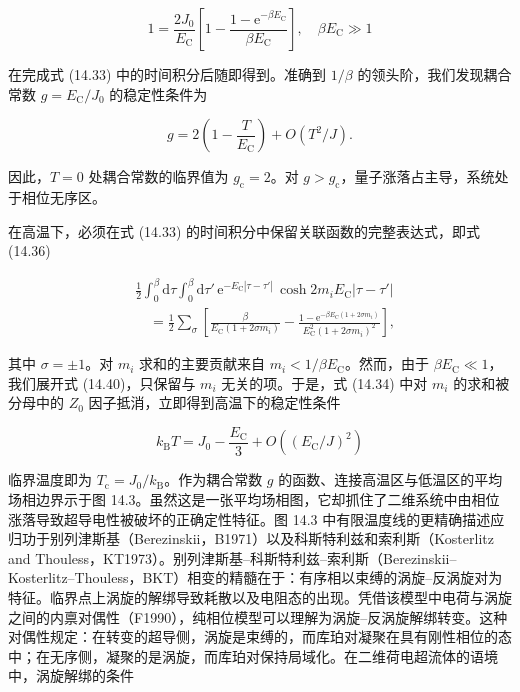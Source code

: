 \begin{equation*}
1 = \frac{2J_0}{E_{\mathrm{C}}} \left[ 1 - \frac{1-\mathrm{e}^{-\beta E_{\mathrm{C}}}}{\beta E_{\mathrm{C}}} \right], \quad \beta E_{\mathrm{C}}\gg 1\tag{14.38}
\end{equation*}

在完成式 (14.33) 中的时间积分后随即得到。准确到 $1/\beta$ 的领头阶，我们发现耦合常数 $g=E_{\mathrm{C}}/J_0$ 的稳定性条件为

\begin{equation*}
g = 2\left( 1 - \frac{T}{E_{\mathrm{C}}} \right) + O(T^2/J).\tag{14.39}
\end{equation*}

因此，$T=0$ 处耦合常数的临界值为 $g_{\mathrm{c}}=2$。对 $g>g_{\mathrm{c}}$，量子涨落占主导，系统处于相位无序区。

在高温下，必须在式 (14.33) 的时间积分中保留关联函数的完整表达式，即式 (14.36)

\begin{align*}
& \frac{1}{2}\int_0^{\beta}\mathrm{d}\tau\int_0^{\beta}\mathrm{d}\tau'\, \mathrm{e}^{-E_{\mathrm{C}}|\tau-\tau'|}\, \cosh 2m_i E_{\mathrm{C}}|\tau-\tau'| \\
& \quad = \frac{1}{2}\sum_{\sigma} \left[ \frac{\beta}{E_{\mathrm{C}}(1+2\sigma m_i)} - \frac{1-\mathrm{e}^{-\beta E_{\mathrm{C}}(1+2\sigma m_i)}}{E_{\mathrm{C}}^2(1+2\sigma m_i)^2} \right],\tag{14.40}
\end{align*}

其中 $\sigma=\pm 1$。对 $m_i$ 求和的主要贡献来自 $m_i<1/\beta E_{\mathrm{C}}$。然而，由于 $\beta E_{\mathrm{C}}\ll 1$，我们展开式 (14.40)，只保留与 $m_i$ 无关的项。于是，式 (14.34) 中对 $m_i$ 的求和被分母中的 $Z_0$ 因子抵消，立即得到高温下的稳定性条件

\begin{equation*}
k_{\mathrm{B}}T = J_0 - \frac{E_{\mathrm{C}}}{3} + O((E_{\mathrm{C}}/J)^2)\tag{14.41}
\end{equation*}

临界温度即为 $T_{\mathrm{c}}=J_0/k_{\mathrm{B}}$。作为耦合常数 $g$ 的函数、连接高温区与低温区的平均场相边界示于图 14.3。虽然这是一张平均场相图，它却抓住了二维系统中由相位涨落导致超导电性被破坏的正确定性特征。图 14.3 中有限温度线的更精确描述应归功于别列津斯基（Berezinskii，B1971）以及科斯特利兹和索利斯（Kosterlitz and Thouless，KT1973）。别列津斯基–科斯特利兹–索利斯（Berezinskii--Kosterlitz--Thouless，BKT）相变的精髓在于：有序相以束缚的涡旋–反涡旋对为特征。临界点上涡旋的解绑导致耗散以及电阻态的出现。凭借该模型中电荷与涡旋之间的内禀对偶性（F1990），纯相位模型可以理解为涡旋–反涡旋解绑转变。这种对偶性规定：在转变的超导侧，涡旋是束缚的，而库珀对凝聚在具有刚性相位的态中；在无序侧，凝聚的是涡旋，而库珀对保持局域化。在二维荷电超流体的语境中，涡旋解绑的条件

